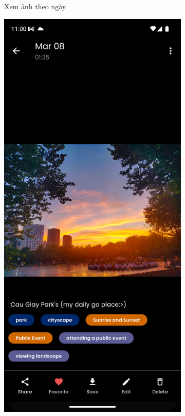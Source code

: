 \begin{figure}[H]
\begin{subfigure}{0.32\textwidth}
        \caption{Xem ảnh theo ngày}
    \end{subfigure}
    \hfill
    \begin{subfigure}{0.32\textwidth}
        \includegraphics[width=1\linewidth]{figures/c4/4-2/image.png} 

\end{subfigure}
\end{figure}
